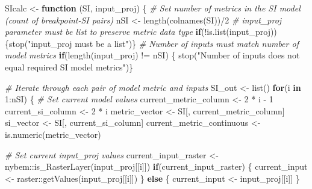 \documentclass[
]{book}
\newenvironment{Shaded}{\begin{snugshade}}{\end{snugshade}}
\newcommand{\CommentTok}[1]{\textcolor[rgb]{0.56,0.35,0.01}{\textit{#1}}}
\newcommand{\ControlFlowTok}[1]{\textcolor[rgb]{0.13,0.29,0.53}{\textbf{#1}}}
\newcommand{\DecValTok}[1]{\textcolor[rgb]{0.00,0.00,0.81}{#1}}
\newcommand{\FunctionTok}[1]{\textcolor[rgb]{0.00,0.00,0.00}{#1}}
\newcommand{\NormalTok}[1]{#1}
\newcommand{\OtherTok}[1]{\textcolor[rgb]{0.56,0.35,0.01}{#1}}
\newcommand{\SpecialCharTok}[1]{\textcolor[rgb]{0.00,0.00,0.00}{#1}}
\newcommand{\StringTok}[1]{\textcolor[rgb]{0.31,0.60,0.02}{#1}}
\begin{document}
\begin{Shaded}
\begin{Highlighting}[]
\NormalTok{SIcalc }\OtherTok{\textless{}{-}} \ControlFlowTok{function}\NormalTok{ (SI, input\_proj) \{}
  \CommentTok{\# Set number of metrics in the SI model (count of breakpoint{-}SI pairs)}
\NormalTok{  nSI }\OtherTok{\textless{}{-}} \FunctionTok{length}\NormalTok{(}\FunctionTok{colnames}\NormalTok{(SI))}\SpecialCharTok{/}\DecValTok{2}
  \CommentTok{\# input\_proj parameter must be list to preserve metric data type}
  \ControlFlowTok{if}\NormalTok{(}\SpecialCharTok{!}\FunctionTok{is.list}\NormalTok{(input\_proj)) \{}\FunctionTok{stop}\NormalTok{(}\StringTok{"input\_proj must be a list"}\NormalTok{)\}}
  \CommentTok{\# Number of inputs must match number of model metrics}
  \ControlFlowTok{if}\NormalTok{(}\FunctionTok{length}\NormalTok{(input\_proj) }\SpecialCharTok{!=}\NormalTok{ nSI) \{}
    \FunctionTok{stop}\NormalTok{(}\StringTok{"Number of inputs does not equal required SI model metrics"}\NormalTok{)\}}

  \CommentTok{\# Iterate through each pair of model metric and inputs}
\NormalTok{  SI\_out }\OtherTok{\textless{}{-}} \FunctionTok{list}\NormalTok{()}
  \ControlFlowTok{for}\NormalTok{(i }\ControlFlowTok{in} \DecValTok{1}\SpecialCharTok{:}\NormalTok{nSI) \{}
    \CommentTok{\# Set current model values}
\NormalTok{    current\_metric\_column }\OtherTok{\textless{}{-}} \DecValTok{2} \SpecialCharTok{*}\NormalTok{ i }\SpecialCharTok{{-}} \DecValTok{1}
\NormalTok{    current\_si\_column     }\OtherTok{\textless{}{-}} \DecValTok{2} \SpecialCharTok{*}\NormalTok{ i}
\NormalTok{    metric\_vector }\OtherTok{\textless{}{-}}\NormalTok{ SI[, current\_metric\_column]}
\NormalTok{    si\_vector     }\OtherTok{\textless{}{-}}\NormalTok{ SI[, current\_si\_column]}
\NormalTok{    current\_metric\_continuous }\OtherTok{\textless{}{-}} \FunctionTok{is.numeric}\NormalTok{(metric\_vector)}

    \CommentTok{\# Set current input\_proj values}
\NormalTok{    current\_input\_raster }\OtherTok{\textless{}{-}}\NormalTok{ nybem}\SpecialCharTok{::}\FunctionTok{is\_RasterLayer}\NormalTok{(input\_proj[[i]])}
    \ControlFlowTok{if}\NormalTok{(current\_input\_raster) \{}
\NormalTok{      current\_input }\OtherTok{\textless{}{-}}\NormalTok{ raster}\SpecialCharTok{::}\FunctionTok{getValues}\NormalTok{(input\_proj[[i]])}
\NormalTok{    \} }\ControlFlowTok{else}\NormalTok{ \{}
\NormalTok{      current\_input }\OtherTok{\textless{}{-}}\NormalTok{ input\_proj[[i]]}
\NormalTok{    \}}


\end{Highlighting}
\end{Shaded}
\end{document}
